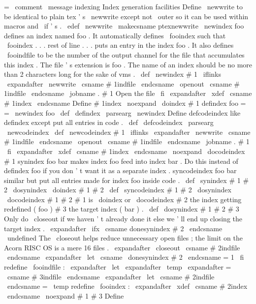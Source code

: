 {=
\
comment
\
message
{
indexing
}
%
Index
generation
facilities
%
Define
\
newwrite
to
be
identical
to
plain
tex
'
s
\
newwrite
%
except
not
\
outer
so
it
can
be
used
within
macros
and
\
if
'
s
.
\
edef
\
newwrite
{
\
makecsname
{
ptexnewwrite
}
}
%
\
newindex
{
foo
}
defines
an
index
named
foo
.
%
It
automatically
defines
\
fooindex
such
that
%
\
fooindex
.
.
.
rest
of
line
.
.
.
puts
an
entry
in
the
index
foo
.
%
It
also
defines
\
fooindfile
to
be
the
number
of
the
output
channel
for
%
the
file
that
accumulates
this
index
.
The
file
'
s
extension
is
foo
.
%
The
name
of
an
index
should
be
no
more
than
2
characters
long
%
for
the
sake
of
vms
.
%
\
def
\
newindex
#
1
{
%
\
iflinks
\
expandafter
\
newwrite
\
csname
#
1indfile
\
endcsname
\
openout
\
csname
#
1indfile
\
endcsname
\
jobname
.
#
1
%
Open
the
file
\
fi
\
expandafter
\
xdef
\
csname
#
1index
\
endcsname
{
%
%
Define
#
1index
\
noexpand
\
doindex
{
#
1
}
}
}
%
defindex
foo
=
=
\
newindex
{
foo
}
%
\
def
\
defindex
{
\
parsearg
\
newindex
}
%
Define
defcodeindex
like
defindex
except
put
all
entries
in
code
.
%
\
def
\
defcodeindex
{
\
parsearg
\
newcodeindex
}
%
\
def
\
newcodeindex
#
1
{
%
\
iflinks
\
expandafter
\
newwrite
\
csname
#
1indfile
\
endcsname
\
openout
\
csname
#
1indfile
\
endcsname
\
jobname
.
#
1
\
fi
\
expandafter
\
xdef
\
csname
#
1index
\
endcsname
{
%
\
noexpand
\
docodeindex
{
#
1
}
}
%
}
%
synindex
foo
bar
makes
index
foo
feed
into
index
bar
.
%
Do
this
instead
of
defindex
foo
if
you
don
'
t
want
it
as
a
separate
index
.
%
%
syncodeindex
foo
bar
similar
but
put
all
entries
made
for
index
foo
%
inside
code
.
%
\
def
\
synindex
#
1
#
2
{
\
dosynindex
\
doindex
{
#
1
}
{
#
2
}
}
\
def
\
syncodeindex
#
1
#
2
{
\
dosynindex
\
docodeindex
{
#
1
}
{
#
2
}
}
%
#
1
is
\
doindex
or
\
docodeindex
#
2
the
index
getting
redefined
(
foo
)
%
#
3
the
target
index
(
bar
)
.
\
def
\
dosynindex
#
1
#
2
#
3
{
%
%
Only
do
\
closeout
if
we
haven
'
t
already
done
it
else
we
'
ll
end
up
%
closing
the
target
index
.
\
expandafter
\
ifx
\
csname
donesynindex
#
2
\
endcsname
\
undefined
%
The
\
closeout
helps
reduce
unnecessary
open
files
;
the
limit
on
the
%
Acorn
RISC
OS
is
a
mere
16
files
.
\
expandafter
\
closeout
\
csname
#
2indfile
\
endcsname
\
expandafter
\
let
\
csname
\
donesynindex
#
2
\
endcsname
=
1
\
fi
%
redefine
\
fooindfile
:
\
expandafter
\
let
\
expandafter
\
temp
\
expandafter
=
\
csname
#
3indfile
\
endcsname
\
expandafter
\
let
\
csname
#
2indfile
\
endcsname
=
\
temp
%
redefine
\
fooindex
:
\
expandafter
\
xdef
\
csname
#
2index
\
endcsname
{
\
noexpand
#
1
{
#
3
}
}
%
}
%
Define
}
